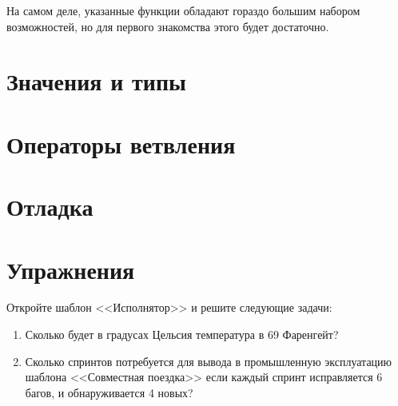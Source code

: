 \documentclass[10pt]{book}
\begin{document}
	На самом деле, указанные функции обладают гораздо большим набором возможностей, но для первого знакомства этого будет достаточно. 
	
	\section{Значения и типы}
	
	\section{Операторы ветвления}
	
	\section{Отладка}
	
	\section{Упражнения}
	
	Откройте шаблон <<Исполнятор>> и решите следующие задачи:
	
	\begin{enumerate}
		\item Сколько будет в градусах Цельсия температура в 69 Фаренгейт?
		
		\item Сколько спринтов потребуется для вывода в промышленную эксплуатацию шаблона <<Совместная поездка>> если каждый спринт исправляется 6 багов, и обнаруживается 4 новых?
	\end{enumerate}
	
\end{document}
